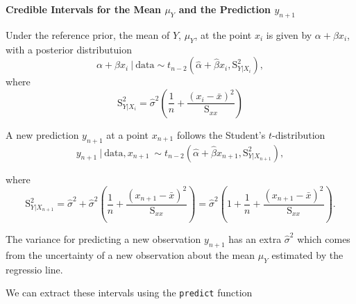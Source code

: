 \documentclass[]{book}
\theoremstyle{definition}
\theoremstyle{definition}
\theoremstyle{definition}
\theoremstyle{remark}
\begin{document}
\textbf{Credible Intervals for the Mean \(\mu_Y\) and the Prediction
\(y_{n+1}\)}

Under the reference prior, the mean of \(Y\), \(\mu_Y\), at the point
\(x_i\) is given by \(\alpha + \beta x_i\), with a posterior
distributuion \[ 
\alpha + \beta x_i ~|~ \text{data} \sim t_{n-2}(\hat{\alpha} + \hat{\beta} x_i, \text{S}_{Y|X_i}^2), 
\] where \[
\text{S}_{Y|X_i}^2 = \hat{\sigma}^2\left(\frac{1}{n}+\frac{(x_i-\bar{x})^2}{\text{S}_{xx}}\right)
\]

A new prediction \(y_{n+1}\) at a point \(x_{n+1}\) follows the
Student's \(t\)-distribution \[ 
y_{n+1}~|~\text{data}, x_{n+1}\ \sim t_{n-2}\left(\hat{\alpha}+\hat{\beta} x_{n+1},\text{S}_{Y|X_{n+1}}^2\right), 
\]

where \[ 
\text{S}_{Y|X_{n+1}}^2 =\hat{\sigma}^2+\hat{\sigma}^2\left(\frac{1}{n}+\frac{(x_{n+1}-\bar{x})^2}{\text{S}_{xx}}\right) = \hat{\sigma}^2\left(1+\frac{1}{n}+\frac{(x_{n+1}-\bar{x})^2}{\text{S}_{xx}}\right).
\]

The variance for predicting a new observation \(y_{n+1}\) has an extra
\(\hat{\sigma}^2\) which comes from the uncertainty of a new observation
about the mean \(\mu_Y\) estimated by the regressio line.

We can extract these intervals using the \texttt{predict} function
\end{document}
